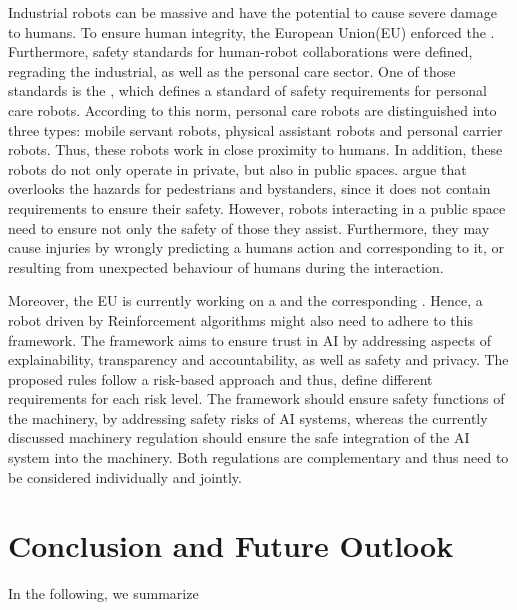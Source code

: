 \documentclass[twoside,11pt]{article}
\begin{document}
Industrial robots can be massive and have the potential to cause severe damage to humans. To ensure human integrity, the European Union(EU) enforced the \cite{EUDirective:2006:Machinery}. Furthermore, safety standards for human-robot collaborations were defined, regrading the industrial, as well as the personal care sector.
One of those standards is the \cite{ISO:13482:2014}, which defines a standard of safety requirements for personal care robots. According to this norm, personal care robots are distinguished into three types: mobile servant robots, physical assistant robots and personal carrier robots. Thus, these robots work in close proximity to humans. In addition, these robots do not only operate in private, but also in public spaces. \cite{SalviniEtAl:2021:ISO13482:2014} argue that \cite{ISO:13482:2014} overlooks the hazards for pedestrians and bystanders, since it does not contain requirements to ensure their safety. However, robots interacting in a public space need to ensure not only the safety of those they assist. Furthermore, they may cause injuries by wrongly predicting a humans action and corresponding to it, or resulting from unexpected behaviour of humans during the interaction.

Moreover, the EU is currently working on a \cite{EC:LegalFramework} and the corresponding \cite{EUResolution:2020:ethicalAI}. Hence, a robot driven by Reinforcement algorithms might also need to adhere to this framework. The framework aims to ensure trust in AI by addressing aspects of explainability, transparency and accountability, as well as safety and privacy. The proposed rules follow a risk-based approach and thus, define different requirements for each risk level. The framework should ensure safety functions of the machinery, by addressing safety risks of AI systems, whereas the currently discussed machinery regulation should ensure the safe integration of the AI system into the machinery. Both regulations are complementary and thus need to be considered individually and jointly.

\section{Conclusion and Future Outlook}

In the following, we summarize 
\end{document}
